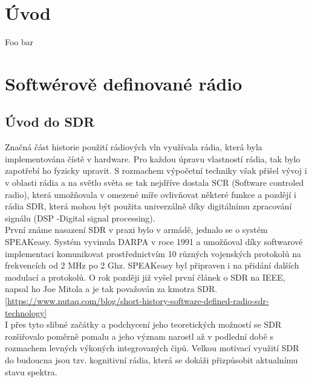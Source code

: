\documentclass{ctuthesis}
\begin{document}
\maketitle

\chapter{Úvod}

Foo bar
\chapter{Softwérově definované rádio}
\section{Úvod do SDR}
Značná část historie použití rádiových vln využívala rádia, která byla implementována čístě v hardware. Pro každou úpravu  vlastností rádia, tak bylo zapotřebí ho fyzicky upravit. S rozmachem výpočetní techniky však přišel vývoj i v oblasti rádia a na světlo světa se tak nejdříve dostala SCR (Software controled radio), která umožňovala v omezené míře ovlivňovat některé funkce a pozdějí i rádia SDR, která mohou být použita univerzálně díky digitálnímu zpracování signálu (DSP -Digital signal processing). \\
První známe nasazení SDR v praxi bylo v armádě, jednalo se o systém SPEAKeasy. Systém vyvinula DARPA v roce 1991 a umožňoval díky softwarové implementaci komunikovat prostřednictvím 10 různých vojenských protokolů na frekvencích od 2 MHz po 2 Ghz. SPEAKeasy byl připraven i na přidání dalších modulací a protokolů. O rok později již vyšel první článek o SDR na IEEE, napsal ho Joe Mitola a je tak považován za kmotra SDR. \ref{https://www.nutaq.com/blog/short-history-software-defined-radio-sdr-technology}\\
I přes tyto slibné začátky a podchycení jeho teoretických možností se SDR rozšiřovalo poměrně pomalu a jeho význam narostl až v podlední době s rozmachem levných výkoných integrovaných čipů. Velkou motivací využití SDR do budoucna jsou tzv. kognitivní rádia, která se dokáži přizpůsobit aktualnímu stavu spektra.
\end{document}
